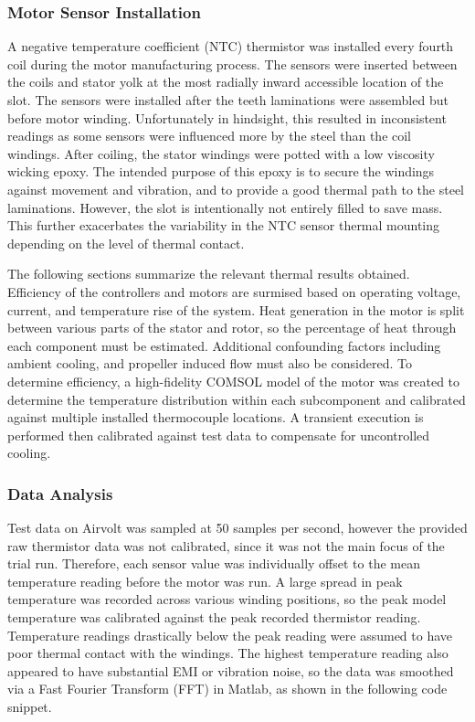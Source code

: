 \documentclass[]{aiaa-tc}%
\begin{document}
\subsubsection{Motor Sensor Installation}
A negative temperature coefficient (NTC) thermistor was installed every fourth coil during the motor manufacturing process. The sensors were inserted between the coils and stator yolk at the most radially inward accessible location of the slot. The sensors were installed after the teeth laminations were assembled but before motor winding. Unfortunately in hindsight, this resulted in inconsistent readings as some sensors were influenced more by the steel than the coil windings. After coiling, the stator windings were potted with a low viscosity wicking epoxy. The intended purpose of this epoxy is to secure the windings against movement and vibration, and to provide a good thermal path to the steel laminations. However, the slot is intentionally not entirely filled to save mass. This further exacerbates the variability in the NTC sensor thermal mounting depending on the level of thermal contact.

The following sections summarize the relevant thermal results obtained. Efficiency of the controllers and motors are surmised based on operating voltage, current, and temperature rise of the system. Heat generation in the motor is split between various parts of the stator and rotor, so the percentage of heat through each component must be estimated. Additional confounding factors including ambient cooling, and propeller induced flow must also be considered. To determine efficiency, a high-fidelity COMSOL model of the motor was created to determine the temperature distribution within each subcomponent and calibrated against multiple installed thermocouple locations. A transient execution is performed then calibrated against test data to compensate for uncontrolled cooling.


\subsubsection{Data Analysis}

Test data on Airvolt was sampled at 50 samples per second, however the provided raw thermistor data was not calibrated, since it was not the main focus of the trial run. Therefore, each sensor value was individually offset to the mean temperature reading before the motor was run. A large spread in peak temperature was recorded across various winding positions, so the peak model temperature was calibrated against the peak recorded thermistor reading. Temperature readings drastically below the peak reading were assumed to have poor thermal contact with the windings. The highest temperature reading also appeared to have substantial EMI or vibration noise, so the data was smoothed via a Fast Fourier Transform (FFT) in Matlab, as shown in the following code snippet.
\end{document}
